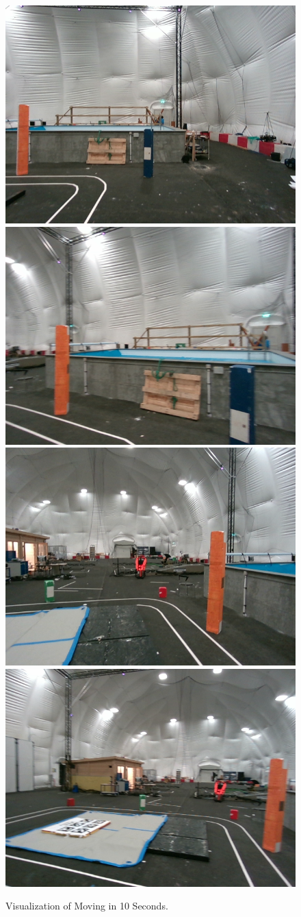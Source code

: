 \begin{figure}
    \centering
    \includegraphics[width=.5\linewidth]{Pictures/sensor_fusion/rgb_1701886823.3972387.png}\hfill
    \includegraphics[width=.5\linewidth]{Pictures/sensor_fusion/rgb_1701886826.5639899.png}\hfill
    \includegraphics[width=.5\linewidth]{Pictures/sensor_fusion/rgb_1701886828.6657953.png}\hfill
    \includegraphics[width=.5\linewidth]{Pictures/sensor_fusion/rgb_1701886831.6306818.png}
    \caption{Visualization of Moving in 10 Seconds.}
    \label{fig:sensor_fusion_3_2}
\end{figure}

